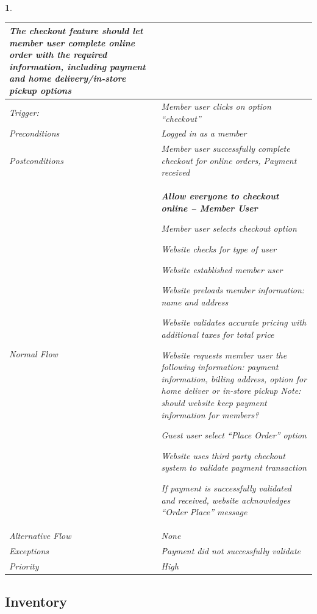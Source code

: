 \documentclass{scrreprt}
\theoremstyle{funreq}
\newtheorem{funreq}{}
\begin{document}
\begin{funreq}
\begin{table}[h!]
{\begin{tabularx}{\columnwidth}{|l|X|}
					The checkout feature should let member user complete online order with the required information, including payment and home delivery/in-store pickup options
					\\ \hline
					Trigger:         & Member user clicks on option “checkout”                    \\ \hline
					Preconditions    & Logged in as a member                                       \\ \hline
					Postconditions   & Member user successfully complete checkout for online orders, Payment received\\ \hline
					Normal Flow &
					\bfseries{Allow everyone to checkout online – Member User}\normalfont\newline 
					
					Member user selects checkout option
					
					Website checks for type of user
					
					Website established member user
					
					Website preloads member information: name and address
					
					Website validates accurate pricing with additional taxes for total price
					
					Website requests member user the following information: payment information, billing address, option for home deliver or in-store pickup \textit{Note: should website keep payment information for member}s?
					
					Guest user select “Place Order” option
					
					Website uses third party checkout system to validate payment transaction
					
					If payment is successfully validated and received, website acknowledges “Order Place” message\\ \hline
					
					Alternative Flow & None                                       \\ \hline
					Exceptions       & Payment did not successfully validate \\ \hline
					Priority & High                                       \\ \hline
				\end{tabularx}%
			}
		\end{table}
	\end{funreq}
	
	
	
	\subsection{Inventory}
\end{document}
